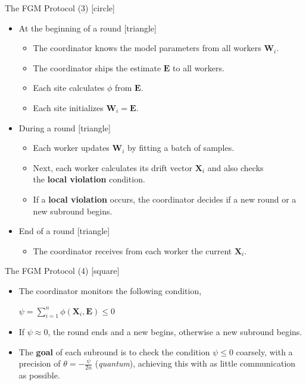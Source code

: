 \begin{frame}{The FGM Protocol (3)}
    [circle]
    \begin{itemize}
        \item{At the beginning of a round
        [triangle]
        \begin{itemize}
            \item{The coordinator knows the model parameters from all workers $\pmb{W}_i$.}
            \item{The coordinator ships the estimate $\pmb{E}$ to all workers.}
            \item{Each site calculates $\phi$ from $\pmb{E}$.}
            \item{Each site initializes $\pmb{W}_i=\pmb{E}$.}
        \end{itemize}
        }
        \item{During a round
        [triangle]
        \begin{itemize}
            \item{Each worker updates $\pmb{W}_i$ by fitting a batch of samples.}
            \item{Next, each worker calculates its drift vector $\pmb{X}_i$ and also checks\\the \textbf{local violation} condition.}
            \item{If a \textbf{local violation} occurs, the coordinator decides if a new round or a new subround begins.}
        \end{itemize}
        }
        \item{End of a round
        [triangle]
        \begin{itemize}
            \item{The coordinator receives from each worker the current $\pmb{X}_i$.}
        \end{itemize}
        }
    \end{itemize}
\end{frame}

\begin{frame}{The FGM Protocol (4)}
    [square]
    \begin{itemize}
        \item{The coordinator monitors the following condition,\\
        \begin{center}
            $\psi = \sum_{i=1}^n\phi(\pmb{X}_i,\pmb{E}) \leq 0$
        \end{center}
        }
        \item{If $\psi\approx0$, the round ends and a new begins, otherwise a new subround begins.}
        \item{The \textbf{goal} of each subround is to check the condition $\psi \leq 0$ coarsely, with a precision of $\theta = -\frac{\psi}{2n}$ (\emph{quantum}), achieving
        this with as little communication as possible.}
    \end{itemize}
\end{frame}
